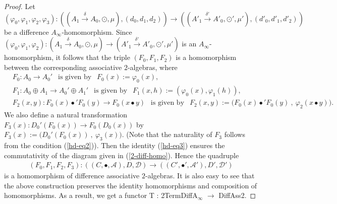 \documentclass[a4paper,reqno,10pt]{amsart}
\theoremstyle{plain}
\theoremstyle{definition}
\theoremstyle{remark}
\begin{document}
\begin{proof}
Let $ (\varphi_0, \varphi_1, \varphi_2, \varphi_3) : ((A_1 \xrightarrow{\delta} A_0, \odot, \mu ), (d_0, d_1, d_2) ) \rightarrow ((A'_1 \xrightarrow{\delta'} A'_0, \odot', \mu' ), (d'_0, d'_1, d'_2) )$ be a difference $A_\infty$-homomorphism. Since $(\varphi_0, \varphi_1, \varphi_2) : (A_1 \xrightarrow{\delta} A_0, \odot, \mu ) \rightarrow (A'_1 \xrightarrow{\delta'} A'_0, \odot', \mu' )$ is an $A_\infty$-homomorphism, it follows that the triple $(F_0, F_1, F_2) $ is a homomorphism between the corresponding associative $2$-algebras, where
\begin{align*}
    &F_0 : A_0 \rightarrow A_0' ~~ \text{ is given by } ~~ F_0 (x) := \varphi_0 (x),\\
    &F_1 : A_0 \oplus A_1 \rightarrow A_0' \oplus A_1' ~~ \text{ is given by } ~~  F_1 (x, h) := ( \varphi_0 (x), \varphi_1 (h)), \\
    &F_2 (x, y) : F_0 (x) \bullet' F_0 (y) \rightarrow F_0 (x \bullet y)  ~~ \text{ is given by } ~~ F_2 (x, y) := \big(  F_0 (x) \bullet' F_0 (y) ~ \! , ~ \! \varphi_2 (x \bullet y)  \big).
\end{align*}
We also define a natural transformation $F_3 (x) : D_0' (F_0 (x)) \rightarrow F_0 (D_0 (x))$ by $F_3 (x) := \big( D_0' (F_0 (x)) ~ \!, ~ \! \varphi_3 (x)    \big).$ (Note that the naturality of $F_3$ follows from the condition (\ref{hd-eq2})). Then the identity (\ref{hd-eq3}) ensures the commutativity of the diagram given in (\ref{2-diff-homo}). Hence the quadruple
\begin{align*}
     (F_0, F_1, F_2, F_3) : ((C , \bullet, \mathcal{A}), D, \mathcal{D}) \rightarrow ((C' , \bullet', \mathcal{A}'), D', \mathcal{D}')
\end{align*}
is a homomorphism of difference associative $2$-algebras. It is also easy to see that the above construction preserves the identity homomorphisms and composition of homomorphisms. As a result, we get a functor {\sf T} : {\sf 2TermDiffA$_\infty$} $\rightarrow$ {\sf DiffAss2}. 

\medskip


\end{proof}
\end{document}
